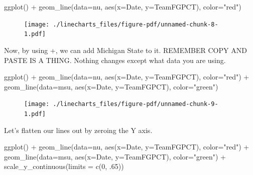 \documentclass[
  letterpaper,
  DIV=11,
  numbers=noendperiod]{scrreprt}
\newenvironment{Shaded}{\begin{snugshade}}{\end{snugshade}}
\newcommand{\AttributeTok}[1]{\textcolor[rgb]{0.40,0.45,0.13}{#1}}
\newcommand{\DecValTok}[1]{\textcolor[rgb]{0.68,0.00,0.00}{#1}}
\newcommand{\FunctionTok}[1]{\textcolor[rgb]{0.28,0.35,0.67}{#1}}
\newcommand{\NormalTok}[1]{\textcolor[rgb]{0.00,0.23,0.31}{#1}}
\newcommand{\SpecialCharTok}[1]{\textcolor[rgb]{0.37,0.37,0.37}{#1}}
\newcommand{\StringTok}[1]{\textcolor[rgb]{0.13,0.47,0.30}{#1}}
\begin{document}
\begin{Shaded}
\begin{Highlighting}[]
\FunctionTok{ggplot}\NormalTok{() }\SpecialCharTok{+} \FunctionTok{geom\_line}\NormalTok{(}\AttributeTok{data=}\NormalTok{nu, }\FunctionTok{aes}\NormalTok{(}\AttributeTok{x=}\NormalTok{Date, }\AttributeTok{y=}\NormalTok{TeamFGPCT), }\AttributeTok{color=}\StringTok{"red"}\NormalTok{)}
\end{Highlighting}
\end{Shaded}

\begin{figure}[H]

{\centering \texttt{[image: ./linecharts\_files/figure-pdf/unnamed-chunk-8-1.pdf]}

}

\end{figure}

Now, by using +, we can add Michigan State to it. REMEMBER COPY AND
PASTE IS A THING. Nothing changes except what data you are using.

\begin{Shaded}
\begin{Highlighting}[]
\FunctionTok{ggplot}\NormalTok{() }\SpecialCharTok{+} 
  \FunctionTok{geom\_line}\NormalTok{(}\AttributeTok{data=}\NormalTok{nu, }\FunctionTok{aes}\NormalTok{(}\AttributeTok{x=}\NormalTok{Date, }\AttributeTok{y=}\NormalTok{TeamFGPCT), }\AttributeTok{color=}\StringTok{"red"}\NormalTok{) }\SpecialCharTok{+} 
  \FunctionTok{geom\_line}\NormalTok{(}\AttributeTok{data=}\NormalTok{msu, }\FunctionTok{aes}\NormalTok{(}\AttributeTok{x=}\NormalTok{Date, }\AttributeTok{y=}\NormalTok{TeamFGPCT), }\AttributeTok{color=}\StringTok{"green"}\NormalTok{)}
\end{Highlighting}
\end{Shaded}

\begin{figure}[H]

{\centering \texttt{[image: ./linecharts\_files/figure-pdf/unnamed-chunk-9-1.pdf]}

}

\end{figure}

Let's flatten our lines out by zeroing the Y axis.

\begin{Shaded}
\begin{Highlighting}[]
\FunctionTok{ggplot}\NormalTok{() }\SpecialCharTok{+} 
  \FunctionTok{geom\_line}\NormalTok{(}\AttributeTok{data=}\NormalTok{nu, }\FunctionTok{aes}\NormalTok{(}\AttributeTok{x=}\NormalTok{Date, }\AttributeTok{y=}\NormalTok{TeamFGPCT), }\AttributeTok{color=}\StringTok{"red"}\NormalTok{) }\SpecialCharTok{+} 
  \FunctionTok{geom\_line}\NormalTok{(}\AttributeTok{data=}\NormalTok{msu, }\FunctionTok{aes}\NormalTok{(}\AttributeTok{x=}\NormalTok{Date, }\AttributeTok{y=}\NormalTok{TeamFGPCT), }\AttributeTok{color=}\StringTok{"green"}\NormalTok{) }\SpecialCharTok{+} 
  \FunctionTok{scale\_y\_continuous}\NormalTok{(}\AttributeTok{limits =} \FunctionTok{c}\NormalTok{(}\DecValTok{0}\NormalTok{, .}\DecValTok{65}\NormalTok{))}
\end{Highlighting}
\end{Shaded}
\end{document}
